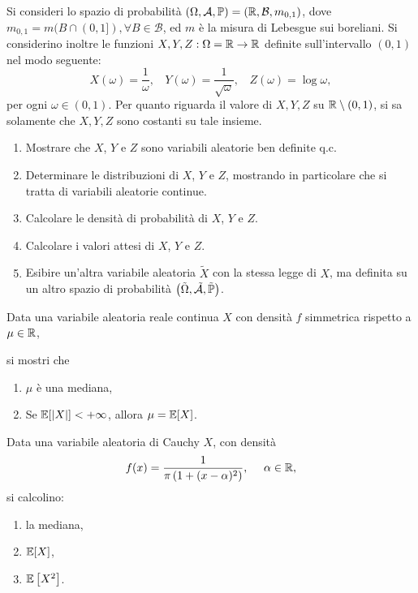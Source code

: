 

\ParteEsercizi
\Esercizio{}

Si consideri lo spazio di probabilità $(\Omega,\mathcal{A},\mathbb{P}) =(\mathbb{R} ,\mathcal{B} ,m_{0,1})$, dove $m_{0,1} =m(B\cap (0,1]) ,\forall B\in \mathcal{B}$, ed $m$ è la misura di Lebesgue sui boreliani. Si considerino inoltre le funzioni $X,Y,Z:\Omega =\mathbb{R}\rightarrow \mathbb{R}$ definite sull'intervallo $(0,1)$ nel modo seguente:
\begin{equation*}
X(\omega) =\frac{1}{\omega } ,\ \ \ \ Y(\omega) =\frac{1}{\sqrt{\omega }} ,\ \ \ \ Z(\omega) =\log \omega ,
\end{equation*}
per ogni $\omega \in (0,1)$. Per quanto riguarda il valore di $X,Y,Z$ su $\mathbb{R} \setminus (0,1)$, si sa solamente che $X,Y,Z$ sono costanti su tale insieme.
\begin{enumerate}
\item Mostrare che $X$, $Y$ e $Z$ sono variabili aleatorie ben definite q.c.
\item Determinare le distribuzioni di $X$, $Y$ e $Z$, mostrando in particolare che si tratta di variabili aleatorie continue.
\item Calcolare le densità di probabilità di $X$, $Y$ e $Z$.
\item Calcolare i valori attesi di $X$, $Y$ e $Z$.
\item Esibire un'altra variabile aleatoria $\tilde{X}$ con la stessa legge di $X$, ma definita su un altro spazio di probabilità $\left(\tilde{\Omega } ,\tilde{\mathcal{A}} ,\tilde{\mathbb{P}}\right)$.
\end{enumerate}
\Esercizio{}

Data una variabile aleatoria reale continua $X$ con densità $f$ simmetrica rispetto a $\mu \in \mathbb{R}$,

si mostri che
\begin{enumerate}
\item $\mu $ è una mediana,
\item Se $\mathbb{E}[|X|] < +\infty $, allora $\mu =\mathbb{E}[X]$.
\end{enumerate}

Data una variabile aleatoria di Cauchy $X$, con densità
\begin{equation*}
f(x) =\frac{1}{\pi \left(1+(x-\alpha)^{2}\right)} ,\ \ \ \ \alpha \in \mathbb{R} ,
\end{equation*}
si calcolino:
\begin{enumerate}
\item la mediana,
\item $\mathbb{E}[X]$,
\item $\mathbb{E}\left[X^{2}\right]$.
\end{enumerate}
\Esercizio{$\star$}

